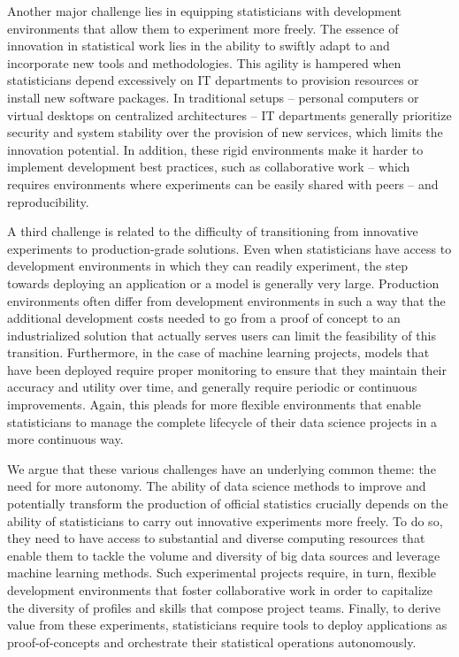 \documentclass[graybox]{svmult}
\begin{document}
Another major challenge lies in equipping statisticians with development environments that allow them to experiment more freely. The essence of innovation in statistical work lies in the ability to swiftly adapt to and incorporate new tools and methodologies. This agility is hampered when statisticians depend excessively on IT departments to provision resources or install new software packages. In traditional setups -- personal computers or virtual desktops on centralized architectures -- IT departments generally prioritize security and system stability over the provision of new services, which limits the innovation potential. In addition, these rigid environments make it harder to implement development best practices, such as collaborative work -- which requires environments where experiments can be easily shared with peers -- and reproducibility.

A third challenge is related to the difficulty of transitioning from innovative experiments to production-grade solutions. Even when statisticians have access to development environments in which they can readily experiment, the step towards deploying an application or a model is generally very large. Production environments often differ from development environments in such a way that the additional development costs needed to go from a proof of concept to an industrialized solution that actually serves users can limit the feasibility of this transition. Furthermore, in the case of machine learning projects, models that have been deployed require proper monitoring to ensure that they maintain their accuracy and utility over time, and generally require periodic or continuous improvements. Again, this pleads for more flexible environments that enable statisticians to manage the complete lifecycle of their data science projects in a more continuous way.

We argue that these various challenges have an underlying common theme: the need for more autonomy. The ability of data science methods to improve and potentially transform the production of official statistics crucially depends on the ability of statisticians to carry out innovative experiments more freely. To do so, they need to have access to substantial and diverse computing resources that enable them to tackle the volume and diversity of big data sources and leverage machine learning methods. Such experimental projects require, in turn, flexible development environments that foster collaborative work in order to capitalize the diversity of profiles and skills that compose project teams. Finally, to derive value from these experiments, statisticians require tools to deploy applications as proof-of-concepts and orchestrate their statistical operations autonomously.
\end{document}
